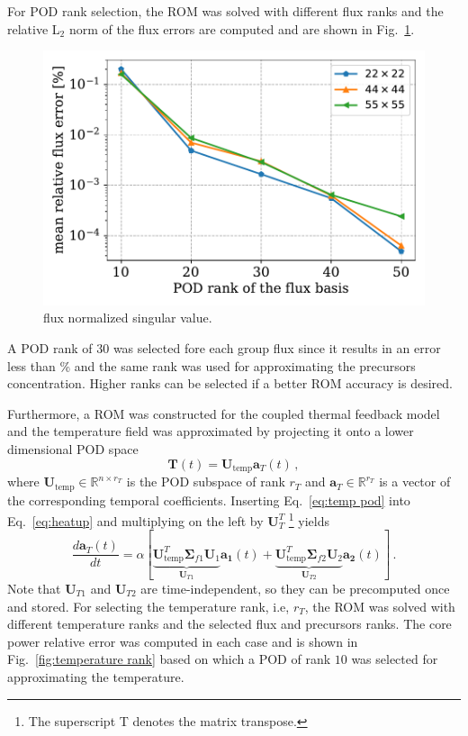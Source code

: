 \documentclass[]{interact}
\theoremstyle{plain}%
\theoremstyle{definition}
\theoremstyle{remark}
\begin{document}
For POD rank selection, the ROM was solved with different flux ranks and the relative L$_2$ norm of the flux errors are computed and are shown in Fig.~\ref{fig:POD flux rank}.
\begin{figure}[h!]
	\includegraphics[width=1.0\linewidth]{../figures/flux_rank_convergence.pdf}
	\caption{flux normalized singular value.}
	\label{fig:POD flux rank}
\end{figure}
A POD rank of 30 was selected fore each group flux since it results in an error less than   \% and the same rank was used for approximating the precursors concentration.
Higher ranks can be selected if a better ROM accuracy is desired.

Furthermore, a ROM was constructed for the coupled thermal feedback model and the temperature field was approximated by projecting it onto a lower dimensional POD space
\begin{equation}
	\mathbf{T}(t) = \mathbf{U}_{\text{temp}}\mathbf{a}_T(t) \, ,
	\label{eq:temp pod}
\end{equation}
where $\mathbf{U}_{\text{temp}}\in\mathbb{R}^{n \times r_T} $ is the POD subspace of rank $r_T$ and $\mathbf{a}_T\in \mathbb{R}^{r_T}$ is a vector of the corresponding temporal coefficients. 
Inserting Eq.~\ref{eq:temp pod} into Eq.~\ref{eq:heatup} and multiplying on the left by $\mathbf{U}_T^T$ \footnote{The superscript T denotes the matrix transpose.} yields
\begin{equation}
	\frac{d\mathbf{a}_T(t)}{dt}  = \alpha [\underbrace{\mathbf{U}_{\text{temp}}^T \boldsymbol{\Sigma}_{f1}\mathbf{U}_1}_{\mathbf{U}_{T1}}\mathbf{a_1}(t) + \underbrace{\mathbf{U}_{\text{temp}}^T\boldsymbol{\Sigma}_{f2}\mathbf{U}_2}_{\mathbf{U}_{T2}}\mathbf{a_2}(t)] \, .
	\label{eq:reduced temp}
\end{equation}
Note that $\mathbf{U}_{T1}$ and $\mathbf{U}_{T2}$ are time-independent, so they can be precomputed once and stored.
For selecting the temperature rank, i.e, $r_T$, the ROM was solved with different temperature ranks and the selected flux and precursors ranks.
The core power relative error was computed in each case and is shown in Fig.~\ref{fig:temperature rank} based on which a POD of rank $10$ was selected for approximating the temperature.
\end{document}
